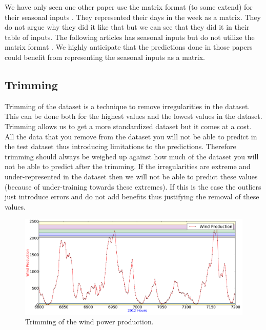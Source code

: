 We have only seen one other paper use the matrix format (to some extend) for their seasonal inputs \cite{crowley2005weather}. They represented their days in the week as a matrix. They do not argue why they did it like that but we can see that they did it in their table of inputs. The following articles has seasonal inputs but do not utilize the matrix format \cite{szkuta1999electricity, singhal2011electricity}. We highly anticipate that the predictions done in those papers could benefit from representing the seasonal inputs as a matrix. 

\subsection{Trimming}
Trimming of the dataset is a technique to remove irregularities in the dataset. This can be done both for the highest values and the lowest values in the dataset. Trimming allows us to get a more standardized dataset but it comes at a cost. All the data that you remove from the dataset you will not be able to predict in the test dataset thus introducing limitations to the predictions. Therefore trimming should always be weighed up against how much of the dataset you will not be able to predict after the trimming. If the irregularities are extreme and under-represented in the dataset then we will not be able to predict these values (because of under-training towards these extremes). If this is the case the outliers just introduce errors and do not add benefits thus justifying the removal of these values.

\begin{figure}[H]
\centering
\includegraphics[width=0.99\linewidth]{billeder/pointingOutPlaceWhereTrim.png}
\caption{Trimming of the wind power production.}
\label{fig:pointingOutPlaceWhereTrimDataManipulation}
\end{figure}

